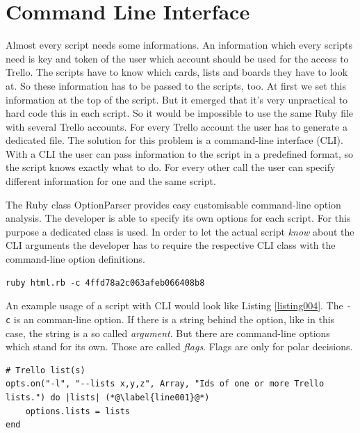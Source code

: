 \section{Command Line Interface}
Almost every script needs some informations. An information which every scripts need is key and token of the user which account should be used for the access to Trello. The scripts have to know which cards, lists and boards they have to look at. So these information has to be passed to the scripts, too. At first we set this information at the top of the script. But it emerged that it's very unpractical to hard code this in each script. So it would be impossible to use the same Ruby file with several Trello accounts. For every Trello account the user has to generate a dedicated file. The solution for this problem is a command-line interface (CLI). With a CLI the user can pass information to the script in a predefined format, so the script knows exactly what to do. For every other call the user can specify different information for one and the same script.

The Ruby class OptionParser\cite{ruby:optionparser} provides easy customisable command-line option analysis. The developer is able to specify its own options for each script. For this purpose a dedicated class is used. 
In order to let the actual script \emph{know} about the CLI arguments the developer has to require the respective CLI class with the command-line option definitions.

\begin{lstlisting}[style=bash, float=htb, caption=Example usage of a script with CLI., label=listing004]
ruby html.rb -c 4ffd78a2c063afeb066408b8
\end{lstlisting}

An example usage of a script with CLI would look like Listing \ref{listing004}. The \texttt{-c} is an comman-line option. If there is a string behind the option, like in this case, the string is a so called \emph{argument}. But there are command-line options which stand for its own. Those are called \emph{flags}. Flags are only for polar decisions.

\begin{lstlisting}[float=htb, caption=Definition of a command-line option, label=listing002]
# Trello list(s)
opts.on("-l", "--lists x,y,z", Array, "Ids of one or more Trello lists.") do |lists| (*@\label{line001}@*)
	options.lists = lists
end
\end{lstlisting}

